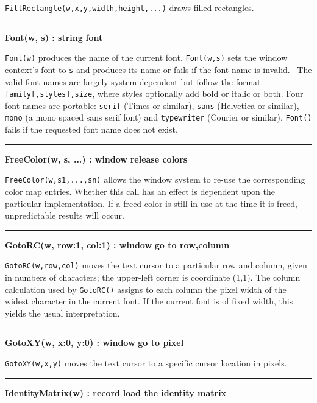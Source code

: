 \noindent
\texttt{FillRectangle(w,x,y,width,height,...)} draws filled rectangles.

\bigskip\hrule\vspace{0.1cm}
\noindent
{\bf Font(w, s) : string } \hfill {\bf font}

\noindent
\texttt{Font(w)} produces the name of the current font.
\texttt{Font(w,s)} sets the window context's font to
\texttt{s} and produces its name or fails if the font name is invalid.
\ The valid font names are largely system-dependent but follow the
format \texttt{family[,styles],size}, where styles optionally add bold
or italic or both. Four font names are portable: \texttt{serif} (Times
or similar), \texttt{sans} (Helvetica or similar), \texttt{mono} (a
mono spaced sans serif font) and \texttt{typewriter} (Courier or
similar). \texttt{Font()} fails if the requested font name does not
exist.

\bigskip\hrule\vspace{0.1cm}
\noindent
{\bf FreeColor(w, s, ...) : window } \hfill {\bf release colors}

\noindent
\texttt{FreeColor(w,s1,...,sn)} allows the window system to re-use the
corresponding color map entries. Whether this call has an effect is
dependent upon the particular implementation. If a freed color is
still in use at the time it is freed, unpredictable results will occur.

\bigskip\hrule\vspace{0.1cm}
\noindent
{\bf GotoRC(w, row:1, col:1) : window } \hfill {\bf go to row,column}

\noindent
\texttt{GotoRC(w,row,col)} moves the text cursor to a particular row and
column, given in numbers of characters; the upper-left corner is
coordinate (1,1). The column calculation used by \texttt{GotoRC()}
assigns to each column the pixel width of the widest character in the
current font. If the current font is of fixed width, this yields the
usual interpretation.

\bigskip\hrule\vspace{0.1cm}
\noindent
{\bf GotoXY(w, x:0, y:0) : window } \hfill {\bf go to pixel}

\noindent
\texttt{GotoXY(w,x,y)} moves the text cursor to a specific cursor
location in pixels.

\bigskip\hrule\vspace{0.1cm}
\noindent
{\bf IdentityMatrix(w) : record } \hfill {\bf load the identity matrix}

